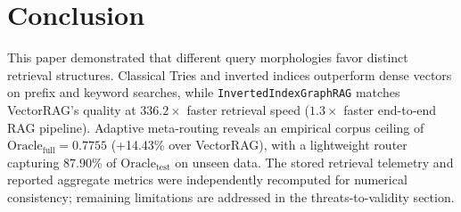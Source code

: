 \documentclass[10pt,twocolumn,letterpaper]{article}
\begin{document}
\section{Conclusion}
This paper demonstrated that different query morphologies favor distinct retrieval structures. Classical Tries and inverted indices outperform dense vectors on prefix and keyword searches, while \texttt{InvertedIndexGraphRAG} matches VectorRAG's quality at $336.2\times$ faster retrieval speed ($1.3\times$ faster end-to-end RAG pipeline). Adaptive meta-routing reveals an empirical corpus ceiling of $\text{Oracle}_{\text{full}} = 0.7755$ (+14.43\% over VectorRAG), with a lightweight router capturing $87.90\%$ of $\text{Oracle}_{\text{test}}$ on unseen data. The stored retrieval telemetry and reported aggregate metrics were independently recomputed for numerical consistency; remaining limitations are addressed in the threats-to-validity section.



\end{document}

